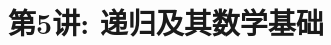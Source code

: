 \documentclass[a4paper, justified]{tufte-handout}
\title{第5讲: 递归及其数学基础}
\date{\zhtoday} %
\begin{document}
\maketitle
\noplagiarism %
\begin{abstract}
\end{abstract}
\beginrequired

\begin{problem}[]
\end{problem}

\begin{solution}
\end{solution}

\begin{problem}[]
\end{problem}

\begin{solution}
\end{solution}

\begin{problem}[]
\end{problem}

\begin{solution}
\end{solution}

\begin{problem}[]
\end{problem}

\begin{solution}
\end{solution}

\begin{problem}[]
\end{problem}

\begin{solution}
\end{solution}

\begin{problem}[]
\end{problem}
\end{document}
